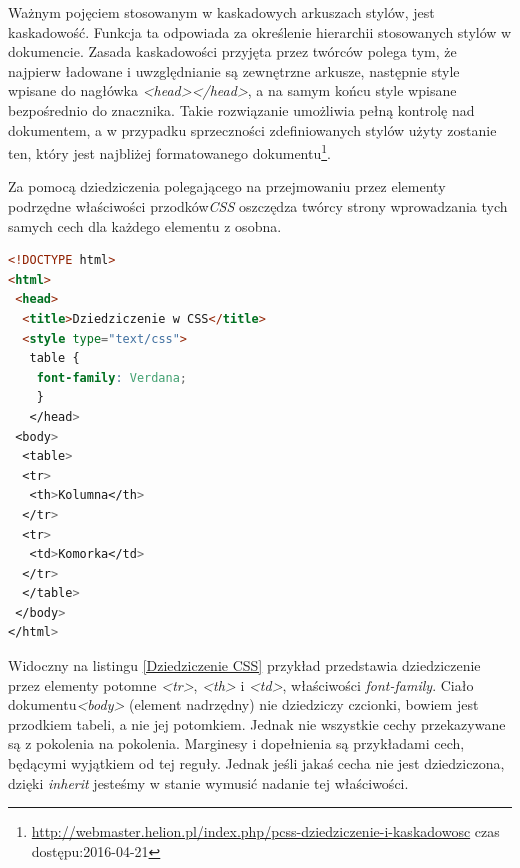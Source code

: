 \documentclass{iiuwb}
\begin{document}
Ważnym pojęciem stosowanym w kaskadowych arkuszach stylów, jest kaskadowość. Funkcja ta odpowiada za określenie hierarchii stosowanych stylów w dokumencie. Zasada kaskadowości przyjęta przez twórców polega tym, że najpierw ładowane i uwzględnianie są zewnętrzne arkusze, następnie style wpisane do nagłówka \textit{<head></head>}, a na samym końcu style wpisane bezpośrednio do znacznika. Takie rozwiązanie umożliwia pełną kontrolę nad dokumentem, a w przypadku sprzeczności zdefiniowanych stylów użyty zostanie ten, który jest najbliżej formatowanego dokumentu\footnote{\url{http://webmaster.helion.pl/index.php/pcss-dziedziczenie-i-kaskadowosc} czas dostępu:2016-04-21}.

Za pomocą dziedziczenia polegającego na przejmowaniu przez elementy podrzędne właściwości przodków\textit{CSS} oszczędza twórcy strony wprowadzania tych samych cech dla każdego elementu z osobna. 
\begin{lstlisting}[language=HTML, label=Dziedziczenie CSS, caption=Dziedziczenie w CSS]
<!DOCTYPE html>
<html>
 <head>
  <title>Dziedziczenie w CSS</title>
  <style type="text/css">
   table {
    font-family: Verdana;
    }
   </head>
 <body>
  <table>
  <tr>
   <th>Kolumna</th>  
  </tr>
  <tr>
   <td>Komorka</td>
  </tr>  
  </table> 
 </body>
</html>
\end{lstlisting} 
Widoczny na listingu \ref{Dziedziczenie CSS} przykład przedstawia dziedziczenie przez elementy potomne \textit{<tr>}, \textit{<th>} i \textit{<td>}, właściwości \textit{font-family}. Ciało dokumentu\textit{<body>} (element nadrzędny) nie dziedziczy czcionki, bowiem jest przodkiem tabeli, a nie jej potomkiem. Jednak nie wszystkie cechy przekazywane są z pokolenia na pokolenia. Marginesy i dopełnienia są przykładami cech, będącymi wyjątkiem od tej reguły. Jednak jeśli jakaś cecha nie jest dziedziczona, dzięki \textit{inherit} jesteśmy w stanie wymusić nadanie tej właściwości. 
\end{document}
